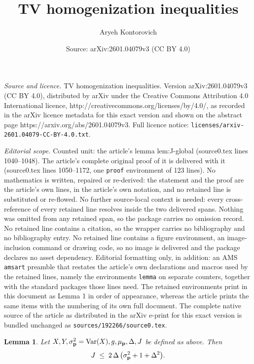 \documentclass[10pt,a4paper]{amsart}
\title{TV homogenization inequalities}
\author{Aryeh Kontorovich}
\date{Source: arXiv:2601.04079v3 (CC BY 4.0)}
\newtheorem{lemma}{Lemma}
\DeclareMathOperator{\Var}{Var}
\renewcommand{\vec}[1]{\textup{{\bf #1}}}
\begin{document}
\maketitle

\noindent\emph{Source and licence.} TV homogenization inequalities. Version arXiv:2601.04079v3 (CC BY 4.0), distributed by arXiv under the Creative Commons Attribution 4.0 International licence, http://creativecommons.org/licenses/by/4.0/, as recorded in the arXiv licence metadata for this exact version and shown on the abstract page https://arxiv.org/abs/2601.04079v3. Full licence notice: \texttt{licenses/arxiv-2601.04079-CC-BY-4.0.txt}.\par\smallskip

\noindent\textit{Editorial scope.} Counted unit: the article's lemma lem:J-global (source0.tex lines 1040--1048). The article's complete original proof of it is delivered with it (source0.tex lines 1050--1172, one \texttt{proof} environment of 123 lines). No mathematics is written, repaired or re-derived: the statement and the proof are the article's own lines, in the article's own notation, and no retained line is substituted or re-flowed.  No further source-local context is needed: every cross-reference of every retained line resolves inside the two delivered spans.  Nothing was omitted from any retained span, so the package carries no omission record.  No retained line contains a citation, so the wrapper carries no bibliography and no bibliography entry.  No retained line contains a figure environment, an image-inclusion command or drawing code, so no image is delivered and the package declares no asset dependency.  Editorial formatting only, in addition: an AMS \texttt{amsart} preamble that restates the article's own declarations and macros used by the retained lines, namely the environments \texttt{lemma} on separate counters, together with the standard packages those lines need.  The retained environments print in this document as Lemma 1 in order of appearance, whereas the article prints the same items with the numbering of its own full document.  The complete native source of the article as distributed in the arXiv e-print for this exact version is bundled unchanged as \texttt{sources/192266/source0.tex}.
\begin{lemma}
\label{lem:J-global}
Let $X,Y,\sigma_{\vec{p}}^2=\Var(X),g,\mu_{\vec{p}},\Delta,J$ be defined as above.
Then
\[
  J \;\le\;
2\,\Delta\,\bigl(\sigma_{\vec{p}}^2+1+\Delta^2\bigr).
\]
\end{lemma}
\end{document}
